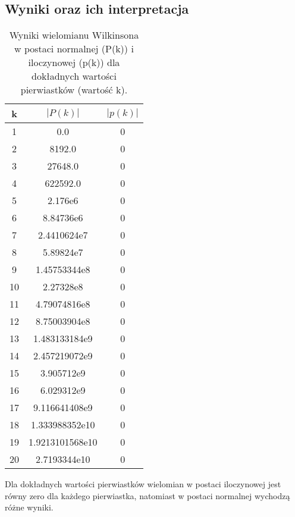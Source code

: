 \documentclass{article}
\begin{document}
\subsection{Wyniki oraz ich interpretacja}
\begin{table}[H]
\centering
\begin{tabular}{|c|c|c|}
\hline
k & $|P(k)|$ & $|p(k)|$ \\
\hline
1 & 0.0 & 0 \\
\hline
2 & 8192.0 & 0 \\
\hline
3 & 27648.0 & 0 \\
\hline
4 & 622592.0 & 0 \\
\hline
5 & 2.176e6 & 0 \\
\hline
6 & 8.84736e6 & 0 \\
\hline
7 & 2.4410624e7 & 0 \\
\hline
8 & 5.89824e7 & 0 \\
\hline
9 & 1.45753344e8 & 0 \\
\hline
10 & 2.27328e8 & 0 \\
\hline
11 & 4.79074816e8 & 0 \\
\hline
12 & 8.75003904e8 & 0 \\
\hline
13 & 1.483133184e9 & 0 \\
\hline
14 & 2.457219072e9 & 0 \\
\hline
15 & 3.905712e9 & 0 \\
\hline
16 & 6.029312e9 & 0 \\
\hline
17 & 9.116641408e9 & 0 \\
\hline
18 & 1.333988352e10 & 0 \\
\hline
19 & 1.9213101568e10 & 0 \\
\hline
20 & 2.7193344e10 & 0 \\
\hline
\end{tabular}
\caption{Wyniki wielomianu Wilkinsona w postaci normalnej (P(k)) i iloczynowej (p(k)) dla dokładnych wartości pierwiastków (wartość k).}
\end{table}
Dla dokładnych wartości pierwiastków wielomian w postaci iloczynowej jest równy zero dla każdego pierwiastka, natomiast w postaci normalnej wychodzą różne wyniki.
\end{document}

